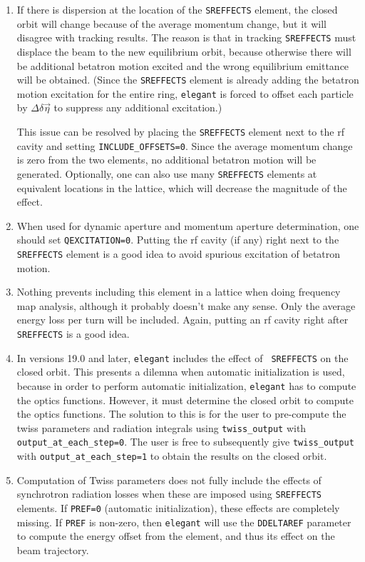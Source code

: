 \begin{enumerate}

\item If there is dispersion at the location of the \verb|SREFFECTS| element,
the closed orbit will change because of the average momentum change, but it will disagree with
tracking results. The reason is that in tracking \verb|SREFFECTS| must displace the beam to the new
equilibrium orbit, because otherwise there will be additional betatron motion excited
and the wrong equilibrium emittance will be obtained.  
(Since the \verb|SREFFECTS| element is already adding the betatron motion excitation for the
entire ring, {\tt elegant} is forced to offset each particle by $\Delta \delta\vec{\eta}$
to suppress any additional excitation.)

This issue can be resolved by placing the \verb|SREFFECTS| element next to the
rf cavity and setting \verb|INCLUDE_OFFSETS=0|.  Since the average momentum change is
zero from the two elements, no additional betatron motion will be generated.
Optionally, one can also use many \verb|SREFFECTS| elements at equivalent locations in
the lattice, which will decrease the magnitude of the effect.

\item When used for dynamic aperture and momentum aperture determination,  
one should set \verb|QEXCITATION=0|.  Putting the rf cavity (if any) right next to
the \verb|SREFFECTS| element is a good idea to avoid spurious excitation of betatron
motion.

\item Nothing prevents including this element in a lattice when doing frequency map analysis, although
it probably doesn't make any sense.  Only the average energy loss per turn will be included.
Again, putting an rf cavity right after \verb|SREFFECTS| is a good idea.

\item In versions 19.0 and later, {\tt elegant} includes the effect of {\tt
SREFFECTS} on the closed orbit.  This presents a dilemna when
automatic initialization is used, because in order to perform
automatic initialization, {\tt elegant} has to compute the optics
functions.  However, it must determine the closed orbit to compute the
optics functions.  The solution to this is for the user to pre-compute
the twiss parameters and radiation integrals using \verb|twiss_output|
with \verb|output_at_each_step=0|.  The user is free to subsequently
give \verb|twiss_output| with \verb|output_at_each_step=1| to obtain
the results on the closed orbit.

\item Computation of Twiss parameters does not fully include the
effects of synchrotron radiation losses when these are imposed using
{\tt SREFFECTS} elements.  If {\tt PREF=0} (automatic initialization),
these effects are completely missing.  If {\tt PREF} is non-zero, then
{\tt elegant} will use the {\tt DDELTAREF} parameter to compute the
energy offset from the element, and thus its effect on the beam
trajectory.

\end{enumerate}

